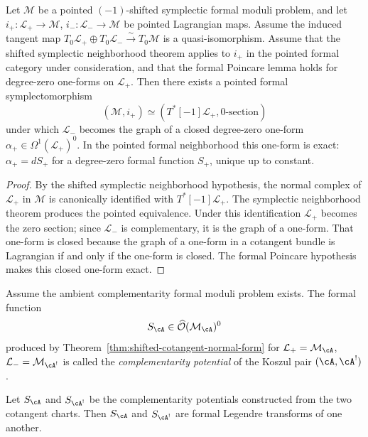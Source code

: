 \begin{theorem}
\label{thm:shifted-cotangent-normal-form}
\ClaimStatusConditional
Let $\mathcal{M}$ be a pointed $(-1)$-shifted symplectic formal moduli
problem, and let $i_+\colon\mathcal{L}_+\to\mathcal{M}$,
$i_-\colon\mathcal{L}_-\to\mathcal{M}$ be pointed Lagrangian maps.
Assume the induced tangent map
$T_0\mathcal{L}_+ \oplus T_0\mathcal{L}_-
\xrightarrow{\sim} T_0\mathcal{M}$
is a quasi-isomorphism. Assume that the shifted symplectic
neighborhood theorem applies to $i_+$ in the pointed formal category
under consideration, and that the formal Poincare lemma holds for
degree-zero one-forms on $\mathcal{L}_+$. Then there exists a pointed
formal
symplectomorphism
\[
(\mathcal{M}, i_+)
\simeq
(T^*[-1]\mathcal{L}_+, 0\text{-section})
\]
under which $\mathcal{L}_-$ becomes the graph of a closed
degree-zero one-form $\alpha_+ \in \Omega^1(\mathcal{L}_+)^0$.
In the pointed formal neighborhood this one-form is exact:
$\alpha_+ = dS_+$
for a degree-zero formal function $S_+$, unique up to constant.
\end{theorem}

\begin{proof}
By the shifted symplectic neighborhood hypothesis, the normal complex of $\mathcal{L}_+$
in $\mathcal{M}$ is canonically identified with
$T^*[-1]\mathcal{L}_+$. The symplectic neighborhood theorem
produces the pointed equivalence. Under this identification
$\mathcal{L}_+$ becomes the zero section; since $\mathcal{L}_-$
is complementary, it is the graph of a one-form. That one-form is
closed because the graph of a one-form in a cotangent bundle is
Lagrangian if and only if the one-form is closed. The formal
Poincare hypothesis makes this closed one-form exact.
\end{proof}

\begin{definition}
\label{def:complementarity-potential-existence}
Assume the ambient complementarity formal moduli problem exists.
The formal function
\[
S_{\cA} \in \widehat{\mathcal{O}}(\mathcal{M}_{\cA})^0
\]
produced by Theorem~\ref{thm:shifted-cotangent-normal-form} for
$\mathcal{L}_+ = \mathcal{M}_{\cA}$,
$\mathcal{L}_- = \mathcal{M}_{\cA^!}$
is called the \emph{complementarity potential} of the Koszul pair
$(\cA, \cA^!)$.
\end{definition}

\begin{proposition}
\label{prop:legendre-duality-potentials}
\ClaimStatusProvedHere
Let $S_{\cA}$ and $S_{\cA^!}$ be the complementarity potentials
constructed from the two cotangent charts. Then $S_{\cA}$ and
$S_{\cA^!}$ are formal Legendre transforms of one another.
\end{proposition}

